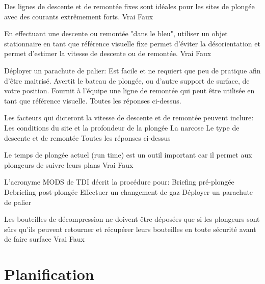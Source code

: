 \documentclass[english,10pt,a4paper,twoside]{article}
\begin{document}
\begin{outline}
		\1 Des lignes de descente et de remontée fixes sont idéales pour les sites de plongée avec des courants extrêmement forts.
			\2 Vrai
			\2 Faux

		\1 En effectuant une descente ou remontée "dans le bleu", utiliser un objet stationnaire en tant que référence visuelle fixe permet d'éviter la désorientation et permet d'estimer la vitesse de descente ou de remontée.
			\2 Vrai
			\2 Faux

		\1 Déployer un parachute de palier:
			\2 Est facile et ne requiert que peu de pratique afin d'être maitrisé.
			\2 Avertit le bateau de plongée, ou d'autre support de surface, de votre position.
			\2 Fournit à l'équipe une ligne de remontée qui peut être utilisée en tant que référence visuelle.
			\2 Toutes les réponses ci-dessus.

		\1 Les facteurs qui dicteront la vitesse de descente et de remontée peuvent inclure:
			\2 Les conditions du site et la profondeur de la plongée
			\2 La narcose
			\2 Le type de descente et de remontée
			\2  Toutes les réponses ci-dessus

		\1 Le temps de plongée actuel (run time) est un outil important car il permet aux plongeurs de suivre leurs plans
			\2 Vrai
			\2 Faux

		\1 L'acronyme MODS de TDI décrit la procédure pour:
			\2 Briefing pré-plongée
			\2 Debriefing post-plongée
			\2 Effectuer un changement de gaz
			\2 Déployer un parachute de palier

		\1 Les bouteilles de décompression ne doivent être déposées que si les plongeurs sont sûrs qu'ils peuvent retourner et récupérer leurs bouteilles en toute sécurité avant de faire surface
			\2 Vrai
			\2 Faux
	\end{outline}
	\vfill
	\pagebreak

	\section{Planification}
\end{document}
